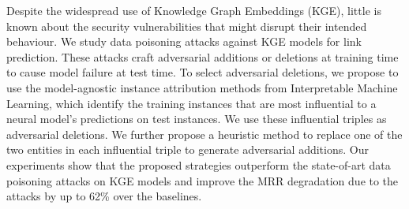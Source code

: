 Despite the widespread use of Knowledge Graph Embeddings (KGE), little is known about the security vulnerabilities that might disrupt their intended behaviour. We study data poisoning attacks against KGE models for link prediction. These attacks craft adversarial additions or deletions at training time to cause model failure at test time. To select adversarial deletions, we propose to use the model-agnostic instance attribution methods from Interpretable Machine Learning, which identify the training instances that are most influential to a neural model's predictions on test instances. We use these influential triples as adversarial deletions. We further propose a heuristic method to replace one of the two entities in each influential triple to generate adversarial additions. Our experiments show that the proposed strategies outperform the state-of-art data poisoning attacks on KGE models and improve the MRR degradation due to the attacks by up to 62\% over the baselines.
